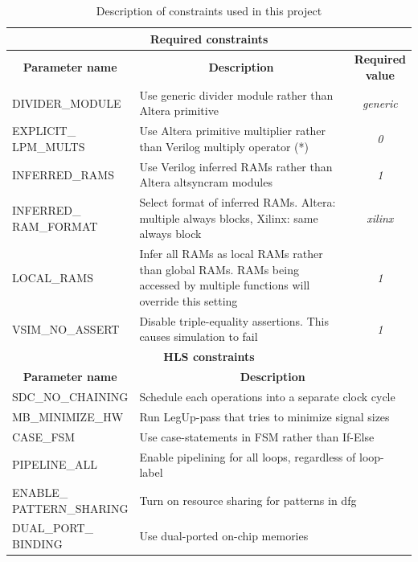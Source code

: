 \begin{table}[hbtp]
    \centering
    \begin{tabular}{l|p{6.4cm}|c}
    \multicolumn{3}{c}{\textbf{Required constraints}} \\
    \toprule
    \multicolumn{1}{c}{\textbf{Parameter name}} & \multicolumn{1}{c}{\textbf{Description}} & \specialcell{\textbf{Required}\\\textbf{value}} \\
    \midrule
    \small{DIVIDER\_MODULE} & Use generic divider module rather than Altera primitive & \textit{generic} \\
    \hline
    \specialcelll{\small{EXPLICIT\_}\\\small{LPM\_MULTS}} & Use Altera primitive multiplier rather than Verilog multiply operator (*) & \textit{0} \\
    \hline
    \small{INFERRED\_RAMS} & Use Verilog inferred RAMs rather than Altera altsyncram modules & \textit{1} \\
    \hline
    \specialcelll[t]{\small{INFERRED\_}\\\small{RAM\_FORMAT}} & Select format of inferred RAMs. Altera: multiple always blocks, Xilinx: same always block & \textit{xilinx} \\
    \hline
    \small{LOCAL\_RAMS} & Infer all RAMs as local RAMs rather than global RAMs. RAMs being accessed by multiple functions will override this setting & \textit{1} \\
    \hline
    \small{VSIM\_NO\_ASSERT} & Disable triple-equality assertions. This causes simulation to fail & \textit{1} \\
    \midrule
    \multicolumn{3}{c}{\textbf{HLS constraints}} \\
    \toprule
    \multicolumn{1}{c}{\textbf{Parameter name}} & \multicolumn{2}{c}{\textbf{Description}} \\
    \midrule
    \small{SDC\_NO\_CHAINING} & \multicolumn{2}{p{8cm}}{Schedule each operations into a separate clock cycle} \\
    \hline
    \small{MB\_MINIMIZE\_HW} & \multicolumn{2}{p{8cm}}{Run LegUp-pass that tries to minimize signal sizes} \\
    \hline
    \small{CASE\_FSM} & \multicolumn{2}{p{8cm}}{Use case-statements in FSM rather than If-Else} \\
    \hline
    \small{PIPELINE\_ALL} & \multicolumn{2}{p{8cm}}{Enable pipelining for all loops, regardless of loop-label} \\
    \hline
    \specialcelll{\small{ENABLE\_}\\\small{PATTERN\_SHARING}} & \multicolumn{2}{p{8cm}}{Turn on resource sharing for patterns in \gls{dfg}} \\
    \hline
    \specialcelll{\small{DUAL\_PORT\_}\\\small{BINDING}} & \multicolumn{2}{p{8cm}}{Use dual-ported on-chip memories} \\
    \bottomrule
    \end{tabular}
    \caption{Description of constraints used in this project}
    \label{tab:constraintssescription}
\end{table}

